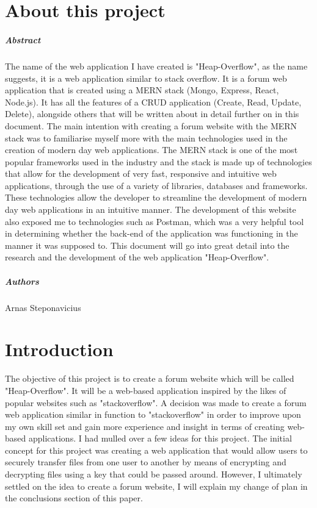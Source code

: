 
\chapter*{About this project}
\paragraph{Abstract}
The name of the web application I have created is "Heap-Overflow", as the name suggests, it is a web application similar to stack overflow. It is a forum web application that is created using a MERN stack (Mongo, Express, React, Node.js). It has all the features of a CRUD application (Create, Read, Update, Delete), alongside others that will be written about in detail further on in this document. The main intention with creating a forum website with the MERN stack was to familiarise myself more with the main technologies used in the creation of modern day web applications. The MERN stack is one of the most popular frameworks used in the industry and the stack is made up of technologies that allow for the development of very fast, responsive and intuitive web applications, through the use of a variety of libraries, databases and frameworks. These technologies allow the developer to streamline the development of modern day web applications in an intuitive manner. The development of this website also exposed me to technologies such as Postman, which was a very helpful tool in determining whether the back-end of the application was functioning in the manner it was supposed to. This document will go into great detail into the research and the development of the web application "Heap-Overflow".

\paragraph{Authors}
Arnas Steponavicius


\chapter{Introduction}
The objective of this project is to create a forum website which will be called "Heap-Overflow". It will be a web-based application inspired by the likes of popular websites such as "stackoverflow". A decision was made to create a forum web application similar in function to "stackoverflow" in order to improve upon my own skill set and gain more experience and insight in terms of creating web-based applications. I had mulled over a few ideas for this project. The initial concept for this project was creating a web application that would allow users to securely transfer files from one user to another by means of encrypting and decrypting files using a key that could be passed around. However, I ultimately settled on the idea to create a forum website, I will explain my change of plan in the conclusions section of this paper.

